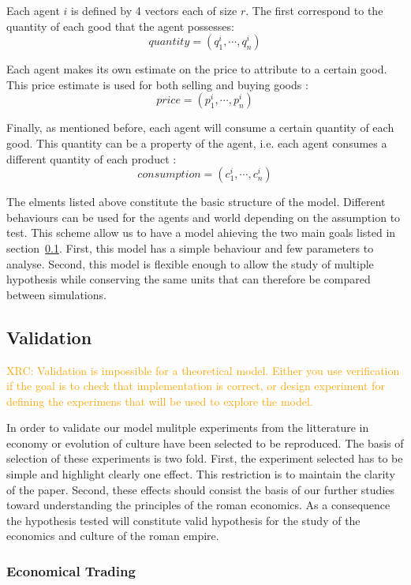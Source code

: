 \documentclass{wscpaperproc}
\newcommand{\memo}[2]{\textcolor{#1}{#2}}
\newcommand{\xrc}[1]{\memo{orange}{XRC: #1\\}}
\begin{document}
Each agent $i$ is defined by 4 vectors each of size $r$. The first correspond to the quantity of each good that the agent possesses: $$ quantity = (q^i_1,\cdots,q^i_n) $$

Each agent makes its own estimate on the price to attribute to a certain good. This price estimate is used for both selling and buying goods :
$$ price = (p^i_1,\cdots,p^i_n) $$
 
Finally, as mentioned before, each agent will consume a certain quantity of each good. This quantity can be a property of the agent, i.e. each agent consumes a different quantity of each product :
$$ consumption = (c^i_1, \cdots, c^i_n) $$ 

The elments listed above constitute the basic structure of the model. Different behaviours can be used for the agents and world depending on the assumption to test. This scheme allow us to have a model ahieving the two main goals listed in section~\ref{}. First, this model has a simple behaviour and few parameters to analyse. Second, this model is flexible enough to allow the study of multiple hypothesis while conserving the same units that can therefore be compared between simulations.


\subsection{Validation}
\xrc{Validation is impossible for a theoretical model. Either you use verification if the goal is to check that implementation is correct, or design experiment for defining the experimens that will be used to explore the model.}

In order to validate our model mulitple experiments from the litterature in economy or evolution of culture have been selected to be reproduced. The basis of selection of these experiments is two fold. First, the experiment selected has to be simple and highlight clearly one effect. This restriction is to maintain the clarity of the paper. Second, these effects should consist the basis of our further studies toward understanding the principles of the roman economics. As a consequence the hypothesis tested will constitute valid hypothesis for the study of the economics and culture of the roman empire.

\subsubsection{Economical Trading}\label{trade}
\end{document}

